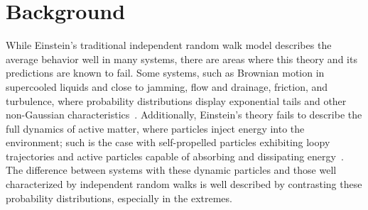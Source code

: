 
\section{Background}

While Einstein's traditional independent random walk model describes the average behavior well in many systems, there are areas where this theory and its predictions are known to fail. Some systems, such as Brownian motion in supercooled liquids and close to jamming, flow and drainage, friction, and turbulence, where probability distributions display exponential tails and other non-Gaussian characteristics~\cite{wang_when_2012, metzler_brownian_2019}. Additionally, Einstein’s theory fails to describe the full dynamics of active matter, where particles inject energy into the environment; such is the case with self-propelled particles exhibiting loopy trajectories and active particles capable of absorbing and dissipating energy~\cite{kanazawa_loopy_2020, ramaswamy_mechanics_2010}. The difference between systems with these dynamic particles and those well characterized by independent random walks is well described by contrasting these probability distributions, especially in the extremes.

